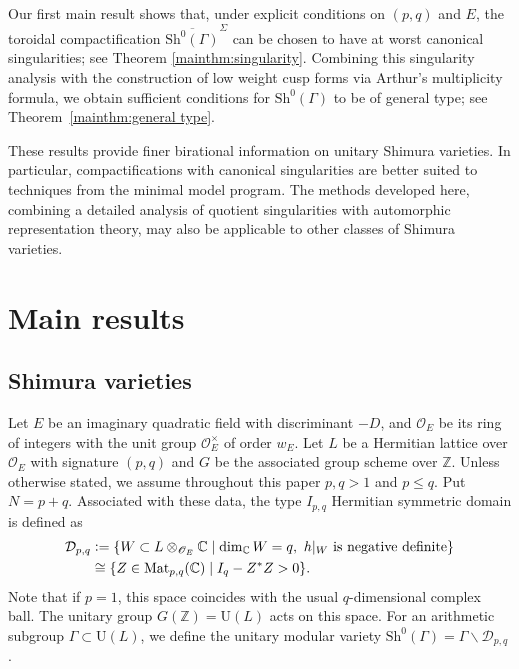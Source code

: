 \documentclass[11pt]{amsart}
\theoremstyle{plain}
\theoremstyle{definition}
\numberwithin{equation}{section}
\def\dim{\mathop{\mathrm{dim}}\nolimits}
\def\OO{\mathscr{O}}
\def\U{\mathrm{U}}
\newcommand{\bbC}{\mathbb{C}}
\newcommand{\bbZ}{\mathbb{Z}}
\newcommand{\Mat}{\mathrm{Mat}}
\newcommand{\defeq}{\vcentcolon=}
\begin{document}
Our first main result shows that, under explicit
conditions on $(p,q)$ and $E$, the toroidal
compactification
$\overline{\mathrm{Sh}^0(\Gamma)}^{\Sigma}$
can be chosen to have at worst canonical singularities;
see Theorem \ref{mainthm:singularity}.
Combining this singularity analysis with the
construction of low weight cusp forms via Arthur's
multiplicity formula, we obtain sufficient conditions
for $\mathrm{Sh}^0(\Gamma)$ to be of general type;
see Theorem~\ref{mainthm:general type}.

These results provide finer birational information on unitary Shimura varieties.
In particular, compactifications with canonical singularities are better suited to techniques from the minimal model program.
The methods developed here, combining a detailed analysis of quotient singularities with automorphic representation theory, may also be applicable to other classes of Shimura varieties.

\section{Main results}
\subsection{Shimura varieties}


Let $E$ be an imaginary quadratic field with discriminant $-D$, and $\OO_E$ be its ring of integers with the unit group $\OO_E^\times$ of order $w_E$.
Let $L$ be a Hermitian lattice over $\OO_E$ with signature $(p,q)$ and $G$ be the associated group scheme over $\bbZ$.
Unless otherwise stated, we assume throughout this paper $p,q > 1$ and $p \leq q$.
Put $N = p+q$.
Associated with these data, the type $I_{p,q}$ Hermitian symmetric domain is defined as
\begin{align}\label{def_realization_D_p,q}
  \mathcal{D}_{p,q}&\defeq\{W \subset L \otimes_{\OO_E} \bbC \mid \dim_{\bbC} W = q,\ h|_W\ \text{is negative definite} \}\\
  &\cong \{Z\in \Mat_{p, q}(\bbC)\mid I_q - Z^*Z>0\}.\notag
\end{align}
Note that if $p=1$, this space coincides with the usual $q$-dimensional complex ball.
The unitary group $G(\bbZ)=\U(L)$ acts on this space.
For an arithmetic subgroup $\Gamma\subset\U(L)$, we define the unitary modular variety $\mathrm{Sh}^0(\Gamma) = \Gamma \backslash \mathcal{D}_{p,q}$.
\end{document}
